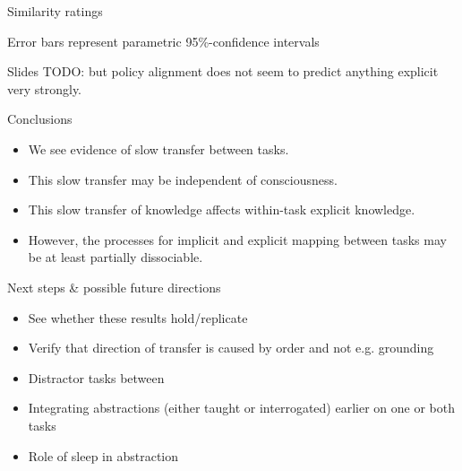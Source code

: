 \documentclass{beamer}
\begin{document}
\begin{frame}{Similarity ratings}
\begin{figure}
\centering
{}
\end{figure}
{\scriptsize Error bars represent parametric 95\%-confidence intervals}
\end{frame}

\begin{frame}
Slides TODO: but policy alignment does not seem to predict anything explicit very strongly. 
\end{frame}

\begin{frame}{Conclusions}
\begin{itemize}
\item We see evidence of slow transfer between tasks.
\item<2-> This slow transfer may be independent of consciousness.
\item<3-> This slow transfer of knowledge affects within-task explicit knowledge. 
\item<4-> However, the processes for implicit and explicit mapping between tasks may be at least partially dissociable. 
\end{itemize}
\end{frame}

\begin{frame}{Next steps \& possible future directions}
\begin{itemize}
\item See whether these results hold/replicate 
\item<2-> Verify that direction of transfer is caused by order and not e.g. grounding
\item<3-> Distractor tasks between
\item<4-> Integrating abstractions (either taught or interrogated) earlier on one or both tasks
\item<5-> Role of sleep in abstraction
\end{itemize}
\end{frame}
\end{document}
